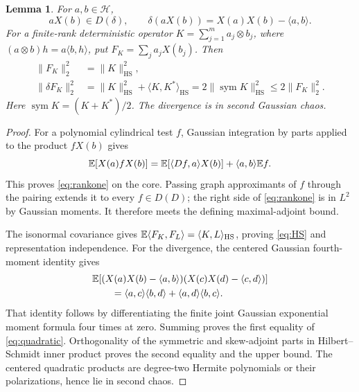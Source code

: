 \documentclass[11pt]{article}
\newtheorem{lemma}[theorem]{Lemma}
\newcommand{\Hh}{\mathcal H}\newcommand{\tr}{\operatorname{tr}}
\begin{document}
\begin{lemma}\label{lem:rankone}
For $a,b\in\Hh$,
\begin{equation}\label{eq:rankone}
 aX(b)\in D(\delta),\qquad
 \delta(aX(b))=X(a)X(b)-\langle a,b\rangle.
\end{equation}
For a finite-rank deterministic operator
$K=\sum_{j=1}^m a_j\otimes b_j$, where
$(a\otimes b)h=a\langle b,h\rangle$, put
$F_K=\sum_j a_jX(b_j)$. Then
\begin{align}
 \|F_K\|_2^2&=\|K\|_{\mathrm{HS}}^2,\label{eq:HS}\\
 \|\delta F_K\|_2^2
 &=\|K\|_{\mathrm{HS}}^2+\langle K,K^*\rangle_{\mathrm{HS}}
 =2\|\operatorname{sym}K\|_{\mathrm{HS}}^2
 \leq2\|F_K\|_2^2.\label{eq:quadratic}
\end{align}
Here $\operatorname{sym}K=(K+K^*)/2$. The divergence is in second
Gaussian chaos.
\end{lemma}
\begin{proof}
For a polynomial cylindrical test $f$, Gaussian integration by parts
applied to the product $fX(b)$ gives
\[
 \mathbb E[X(a)fX(b)]=\mathbb E[\langle Df,a\rangle X(b)]
                       +\langle a,b\rangle\mathbb E f.
\]
This proves \eqref{eq:rankone} on the core. Passing graph approximants
of $f$ through the pairing extends it to every $f\in D(D)$; the
right side of \eqref{eq:rankone} is in $L^2$ by Gaussian moments.
It therefore meets the defining maximal-adjoint bound.

The isonormal covariance gives
$\mathbb E\langle F_K,F_L\rangle=\langle K,L\rangle_{\mathrm{HS}}$,
proving \eqref{eq:HS} and representation independence. For the
divergence, the centered Gaussian fourth-moment identity gives
\begin{align*}
 &\mathbb E[(X(a)X(b)-\langle a,b\rangle)
       (X(c)X(d)-\langle c,d\rangle)]\\
 &\hspace{2em}=\langle a,c\rangle\langle b,d\rangle
                       +\langle a,d\rangle\langle b,c\rangle.
\end{align*}
That identity follows by differentiating the finite joint Gaussian
exponential moment formula four times at zero. Summing proves the
first equality of \eqref{eq:quadratic}. Orthogonality of the symmetric
and skew-adjoint parts in Hilbert--Schmidt inner product proves the
second equality and the upper bound. The centered quadratic products
are degree-two Hermite polynomials or their polarizations, hence lie
in second chaos.
\end{proof}
\end{document}
